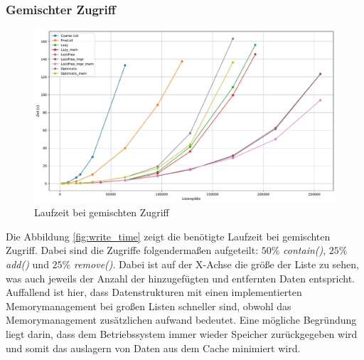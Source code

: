 \subsubsection{Gemischter Zugriff}
\begin{figure}[ht!]
	\centering
	\includegraphics[width=1.0\linewidth]{./plots_pdf/mixed_time} 
	\caption{Laufzeit bei gemischten Zugriff}
	\label{fig:mixed_time} 
\end{figure}
Die Abbildung \ref{fig:write_time} zeigt die benötigte Laufzeit bei gemischten Zugriff. Dabei sind die Zugriffe folgendermaßen aufgeteilt:
 $50\%$ \textit{contain()}, $25\%$ \textit{add()} und $25\%$ \textit{remove()}.
 Dabei ist auf der X-Achse die größe der Liste zu sehen, was auch jeweils der Anzahl der hinzugefügten und entfernten Daten entspricht. 
 Auffallend ist hier, dass Datenstrukturen mit einen implementierten Memorymanagement bei großen Listen schneller sind, obwohl
 das Memorymanagement zusätzlichen aufwand bedeutet. Eine mögliche Begründung liegt darin, dass dem Betriebssystem immer wieder 
 Speicher zurückgegeben wird und somit das auslagern von Daten aus dem Cache minimiert wird.


